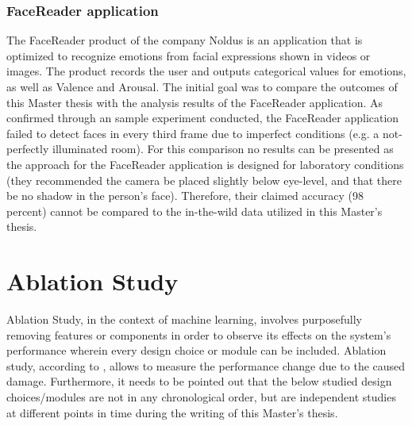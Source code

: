 \subsubsection{FaceReader application}
The FaceReader product of the company Noldus \citep{Noldus:2020:Facereader} is an application that is optimized to recognize emotions from facial expressions shown in videos or images. The product records the user and outputs categorical values for emotions, as well as Valence and Arousal. The initial goal was to compare the outcomes of this Master thesis with the analysis results of the FaceReader application.
\newline\newline
As confirmed through an sample experiment conducted, the FaceReader application failed to detect faces in every third frame due to imperfect conditions (e.g. a not-perfectly illuminated room). For this comparison no results can be presented as the approach for the FaceReader application is designed for laboratory conditions (they recommended the camera be placed slightly below eye-level, and that there be no shadow in the person's face). Therefore, their claimed accuracy (98 percent) cannot be compared to the in-the-wild data utilized in this Master's thesis.


\section{Ablation Study}
Ablation Study, in the context of machine learning, involves purposefully removing features or components in order to observe its effects on the system's performance wherein every design choice or module can be included. Ablation study, according to \citet{Fadelli:2018:AblationInANN}, allows to measure the performance change due to the caused damage.
\newline\newline
Furthermore, it needs to be pointed out that the below studied design choices/modules are not in any chronological order, but are independent studies at different points
in time during the writing of this Master’s thesis.

